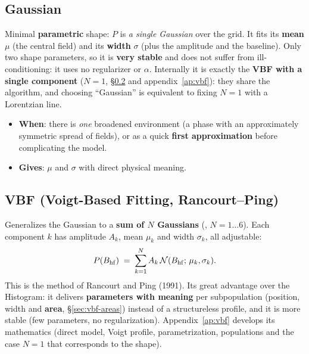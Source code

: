 \subsection{Gaussian}
\label{sec:forma-gaussiana}

Minimal \textbf{parametric} shape: $P$ is \emph{a single Gaussian} over the grid. It
fits its \textbf{mean} $\mu$ (the central field) and its \textbf{width} $\sigma$
(plus the amplitude and the baseline). Only two shape parameters, so it is
\textbf{very stable} and does not suffer from ill-conditioning: it uses no
regularizer or $\alpha$. Internally it is exactly the \textbf{VBF with a single
component} ($N=1$, \S\ref{sec:forma-vbf} and appendix~\ref{ap:vbf}): they share the
algorithm, and choosing ``Gaussian'' is equivalent to fixing $N=1$ with a Lorentzian
line.

\begin{itemize}[nosep]
  \item \textbf{When}: there is \emph{one} broadened environment (a phase with an
        approximately symmetric spread of fields), or as a quick \textbf{first
        approximation} before complicating the model.
  \item \textbf{Gives}: $\mu$ and $\sigma$ with direct physical meaning.
\end{itemize}

\subsection{VBF (Voigt-Based Fitting, Rancourt--Ping)}
\label{sec:forma-vbf}

Generalizes the Gaussian to a \textbf{sum of $N$ Gaussians} (,
$N=1\ldots6$). Each component $k$ has amplitude $A_k$, mean $\mu_k$ and width
$\sigma_k$, all adjustable:
\[
  P(B_{\mathrm{hf}}) \;=\; \sum_{k=1}^{N} A_k \,
  \mathcal{N}(B_{\mathrm{hf}};\,\mu_k,\sigma_k).
\]
This is the method of Rancourt and Ping (1991). Its great advantage over the
Histogram: it delivers \textbf{parameters with meaning} per subpopulation (position,
width and \textbf{area}, \S\ref{sec:vbf-areas}) instead of a structureless profile,
and it is more stable (few parameters, no regularization). Appendix~\ref{ap:vbf}
develops its mathematics (direct model, Voigt profile, parametrization, populations
and the case $N=1$ that corresponds to the  shape).

